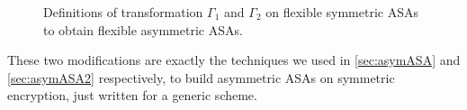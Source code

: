 \begin{figure}
\centering
\begin{pchstack}
\pchspace
{}
\end{pchstack}
\caption[Definitions of transformation $\Gamma_1$ and $\Gamma_2$ on flexible symmetric ASAs to obtain flexible asymmetric ASAs]{Definitions of transformation $\Gamma_1$ and $\Gamma_2$ on flexible symmetric ASAs to obtain flexible asymmetric ASAs.}
\label{figure:gammas}
\end{figure}

These two modifications are exactly the techniques we used in \autoref{sec:asymASA} and \autoref{sec:asymASA2} respectively, to build asymmetric ASAs on symmetric encryption, just written for a generic scheme.

